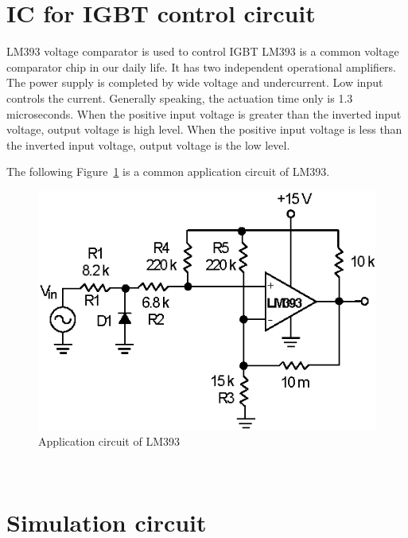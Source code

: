 \section{IC for IGBT control circuit}
\label{sec:IC for IGBT control circuit}
LM393 voltage comparator is used to control IGBT 
LM393 is a common voltage comparator chip in our daily life. It has two independent operational amplifiers. The power supply is completed by wide voltage and undercurrent. Low input controls the current. Generally speaking, the actuation time only is 1.3 microseconds. When the positive input voltage is greater than the inverted input voltage, output voltage is high level. When the positive input voltage is less than the inverted input voltage, output voltage is the low level. 

The following Figure~\ref{fig:3.2} is a common application circuit of LM393.

\begin{figure}[!ht]
	\centering
	\includegraphics[width=13cm]{grafiken/3.2.eps}
	\caption{Application circuit of LM393} 
	\label{fig:3.2}
\end{figure}
\FloatBarrier
\\
\section{Simulation circuit}
\label{sec:Simulation circuit}

